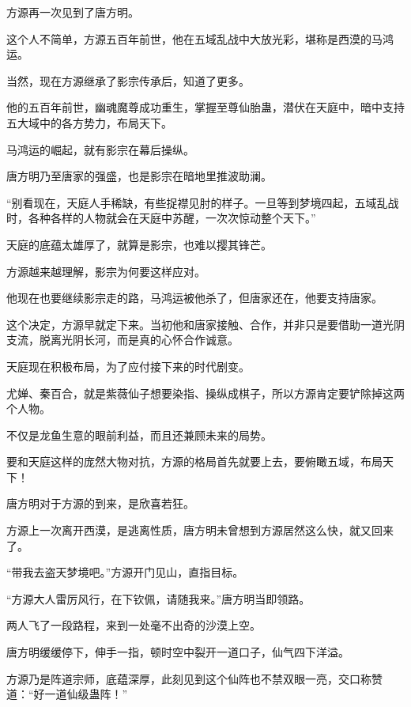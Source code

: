 
\begin{this_body}



方源再一次见到了唐方明。

这个人不简单，方源五百年前世，他在五域乱战中大放光彩，堪称是西漠的马鸿运。

当然，现在方源继承了影宗传承后，知道了更多。

他的五百年前世，幽魂魔尊成功重生，掌握至尊仙胎蛊，潜伏在天庭中，暗中支持五大域中的各方势力，布局天下。

马鸿运的崛起，就有影宗在幕后操纵。

唐方明乃至唐家的强盛，也是影宗在暗地里推波助澜。

“别看现在，天庭人手稀缺，有些捉襟见肘的样子。一旦等到梦境四起，五域乱战时，各种各样的人物就会在天庭中苏醒，一次次惊动整个天下。”

天庭的底蕴太雄厚了，就算是影宗，也难以撄其锋芒。

方源越来越理解，影宗为何要这样应对。

他现在也要继续影宗走的路，马鸿运被他杀了，但唐家还在，他要支持唐家。

这个决定，方源早就定下来。当初他和唐家接触、合作，并非只是要借助一道光阴支流，脱离光阴长河，而是真的心怀合作诚意。

天庭现在积极布局，为了应付接下来的时代剧变。

尤婵、秦百合，就是紫薇仙子想要染指、操纵成棋子，所以方源肯定要铲除掉这两个人物。

不仅是龙鱼生意的眼前利益，而且还兼顾未来的局势。

要和天庭这样的庞然大物对抗，方源的格局首先就要上去，要俯瞰五域，布局天下！

唐方明对于方源的到来，是欣喜若狂。

方源上一次离开西漠，是逃离性质，唐方明未曾想到方源居然这么快，就又回来了。

“带我去盗天梦境吧。”方源开门见山，直指目标。

“方源大人雷厉风行，在下钦佩，请随我来。”唐方明当即领路。

两人飞了一段路程，来到一处毫不出奇的沙漠上空。

唐方明缓缓停下，伸手一指，顿时空中裂开一道口子，仙气四下洋溢。

方源乃是阵道宗师，底蕴深厚，此刻见到这个仙阵也不禁双眼一亮，交口称赞道：“好一道仙级蛊阵！”


\end{this_body}
